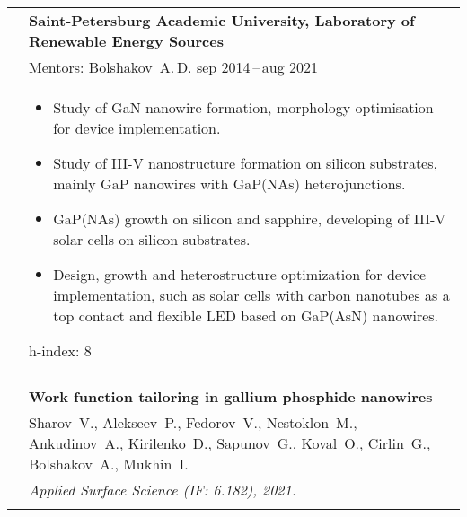 \documentclass[letterpaper, 11pt]{article}
\begin{document}
\begin{longtable}{p{1.3in}p{4.8in}}
		
		\nohyphens{\color{OliveGreen}{Research experience}}
        & \textbf{Saint-Petersburg Academic University, Laboratory of Renewable
        Energy Sources} \\
		& Mentors: Bolshakov~A.\,D. \hfill sep 2014\,--\,aug 2021 \\
        &
		\begin{itemize}
            \item Study of GaN nanowire formation, morphology optimisation for
                device implementation.
            \item Study of III-V nanostructure formation on silicon substrates,
                mainly GaP nanowires with GaP(NAs) heterojunctions.
            \item GaP(NAs) growth on silicon and sapphire, developing of III-V
                solar cells on silicon substrates.
            \item Design, growth and heterostructure optimization for device
                implementation, such as solar cells with carbon nanotubes as a
                top contact and flexible LED based on GaP(AsN) nanowires.
		\end{itemize}
		
		h-index: 8 \\
		& \\
		
		
		
		
		\nohyphens{\color{OliveGreen}{Q1 Publications}}
        & \textbf{Work function tailoring in gallium phosphide nanowires} \\
        & Sharov~V., Alekseev~P., Fedorov~V., Nestoklon~M., Ankudinov~A.,
        Kirilenko~D., Sapunov~G., Koval~O., Cirlin~G., Bolshakov~A., Mukhin~I.
        \\
        & \textit{Applied Surface Science (IF: 6.182), 2021.}\\
		& \\


\end{longtable}
\end{document}
